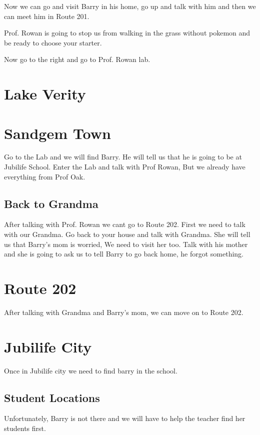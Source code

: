 \documentclass[11pt]{article}
\begin{document}
Now we can go and visit Barry in his home, go up and talk with him
and then we can meet him in Route 201.

Prof. Rowan is going to stop us from walking in the grass without pokemon
and be ready to choose your starter.

Now go to the right and go to Prof. Rowan lab.



\section{Lake Verity}\label{sec:Lake_Verity}


\section{Sandgem Town}\label{sec:sandgem-town}
Go to the Lab and we will find Barry. He will tell us that he is going to be at Jubilife School.
Enter the Lab and talk with Prof Rowan, But we already have everything from Prof Oak.

\subsection{Back to Grandma}\label{subsec:back-to-grandma}
After talking with Prof. Rowan we cant go to Route 202.
First we need to talk with our Grandma.
Go back to your house and talk with Grandma.
She will tell us that Barry's mom is worried, We need to visit her too.
Talk with his mother and she is going to ask us to tell Barry to go back home, he forgot something.

\section{Route 202}\label{sec:Route_202}

After talking with Grandma and Barry's mom, we can move on to Route 202.



\section{Jubilife City}\label{sec:jubilife-city}
Once in Jubilife city we need to find barry in the school.

\subsection{Student Locations}\label{subsec:student-locations}
Unfortunately, Barry is not there and we will have to help the teacher find her students first.
\end{document}
